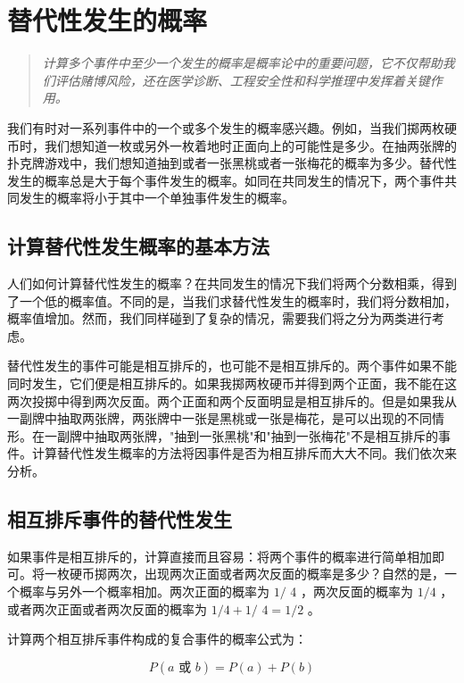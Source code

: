 \section{替代性发生的概率}

\begin{quotation}
\textit{计算多个事件中至少一个发生的概率是概率论中的重要问题，它不仅帮助我们评估赌博风险，还在医学诊断、工程安全性和科学推理中发挥着关键作用。}
\end{quotation}

我们有时对一系列事件中的一个或多个发生的概率感兴趣。例如，当我们掷两枚硬币时，我们想知道一枚或另外一枚着地时正面向上的可能性是多少。在抽两张牌的扑克牌游戏中，我们想知道抽到或者一张黑桃或者一张梅花的概率为多少。替代性发生的概率总是大于每个事件发生的概率。如同在共同发生的情况下，两个事件共同发生的概率将小于其中一个单独事件发生的概率。

\subsection{计算替代性发生概率的基本方法}

人们如何计算替代性发生的概率？在共同发生的情况下我们将两个分数相乘，得到了一个低的概率值。不同的是，当我们求替代性发生的概率时，我们将分数相加，概率值增加。然而，我们同样碰到了复杂的情况，需要我们将之分为两类进行考虑。

替代性发生的事件可能是相互排斥的，也可能不是相互排斥的。两个事件如果不能同时发生，它们便是相互排斥的。如果我掷两枚硬币并得到两个正面，我不能在这两次投掷中得到两次反面。两个正面和两个反面明显是相互排斥的。但是如果我从一副牌中抽取两张牌，两张牌中一张是黑桃或一张是梅花，是可以出现的不同情形。在一副牌中抽取两张牌，"抽到一张黑桃"和"抽到一张梅花"不是相互排斥的事件。计算替代性发生概率的方法将因事件是否为相互排斥而大大不同。我们依次来分析。

\subsection{相互排斥事件的替代性发生}

如果事件是相互排斥的，计算直接而且容易：将两个事件的概率进行简单相加即可。将一枚硬币掷两次，出现两次正面或者两次反面的概率是多少？自然的是，一个概率与另外一个概率相加。两次正面的概率为 $1 /$ 4 ，两次反面的概率为 $1 / 4$ ，或者两次正面或者两次反面的概率为 $1 / 4+1 /$ $4=1 / 2$ 。

计算两个相互排斥事件构成的复合事件的概率公式为：

$$
P(a \text { 或 } b)=P(a)+P(b)
$$

